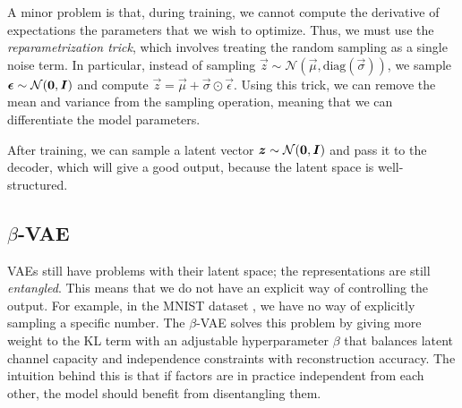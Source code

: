 A minor problem is that, during training, we cannot compute the derivative of expectations \wrt the
parameters that we wish to optimize. Thus, we must use the \textit{reparametrization trick}, which
involves treating the random sampling as a single noise term. In particular, instead of sampling
$\vec{z} \sim \mathcal{N}(\vec{\mu}, \mathrm{diag}(\vec{\sigma}))$, we sample $\bm{\epsilon} \sim
    \mathcal{N}(\bm{0},\bm{I})$ and compute $\vec{z} = \vec{\mu} + \vec{\sigma} \odot
    \vec{\epsilon}$. Using this trick, we can remove the mean and variance from the sampling operation,
meaning that we can differentiate \wrt the model parameters.

After training, we can sample a latent vector $\bm{z} \sim \mathcal{N}(\bm{0}, \bm{I})$ and pass
it to the decoder, which will give a good output, because the latent space is well-structured.

\subsection{$\beta$-VAE}

VAEs still have problems with their latent space; the representations are still
\textit{entangled}. This means that we do not have an explicit way of controlling the output.
For example, in the MNIST dataset \citep{deng2012mnist}, we have no way of explicitly sampling a
specific number. The $\beta$-VAE \citep{higgins2017beta} solves this problem by giving more weight
to the KL term with an adjustable hyperparameter $\beta$ that balances latent channel capacity and
independence constraints with reconstruction accuracy. The intuition behind this is that if factors
are in practice independent from each other, the model should benefit from disentangling them.

